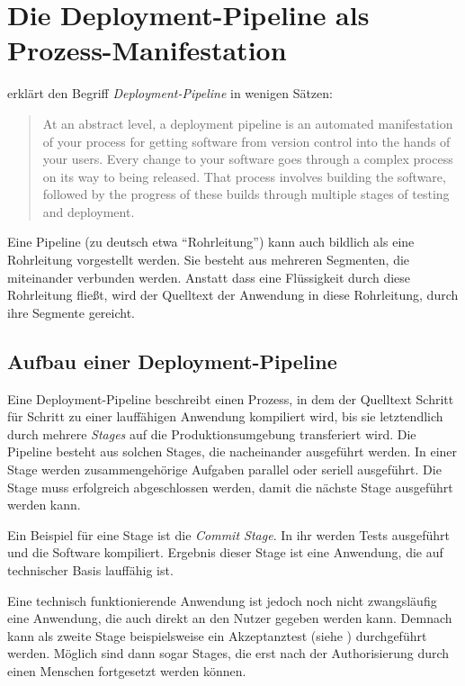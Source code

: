 \section{Die Deployment-Pipeline als Prozess-Manifestation}
\label{sec:deployment-pipeline}

\citet[106]{Humble2010} erklärt den Begriff \emph{Deployment-Pipeline} in wenigen Sätzen:

\begin{quote}
 At an abstract level, a deployment pipeline is an automated manifestation of your process for getting software from version control into the hands of your users. Every change to your software goes through a complex process on its way to being released. That process involves building the software, followed by the progress of these builds through multiple stages of testing and deployment.
\end{quote}

Eine Pipeline (zu deutsch etwa ``Rohrleitung'') kann auch bildlich als eine Rohrleitung vorgestellt werden. Sie besteht aus mehreren Segmenten, die miteinander verbunden werden. Anstatt dass eine Flüssigkeit durch diese Rohrleitung fließt, wird der Quelltext der Anwendung in diese Rohrleitung, durch ihre Segmente gereicht.

\subsection{Aufbau einer Deployment-Pipeline}

Eine Deployment-Pipeline beschreibt einen Prozess, in dem der Quelltext Schritt für Schritt zu einer lauffähigen Anwendung kompiliert wird, bis sie letztendlich durch mehrere \emph{Stages} auf die Produktionsumgebung transferiert wird. Die Pipeline besteht aus solchen Stages, die nacheinander ausgeführt werden. In einer Stage werden zusammengehörige Aufgaben parallel oder seriell ausgeführt. Die Stage muss erfolgreich abgeschlossen werden, damit die nächste Stage ausgeführt werden kann.

Ein Beispiel für eine Stage ist die \emph{Commit Stage}. In ihr werden Tests ausgeführt und die Software kompiliert. Ergebnis dieser Stage ist eine Anwendung, die auf technischer Basis lauffähig ist. \citep[110]{Humble2010}

Eine technisch funktionierende Anwendung ist jedoch noch nicht zwangsläufig eine Anwendung, die auch direkt an den Nutzer gegeben werden kann. Demnach kann als zweite Stage beispielsweise ein Akzeptanztest (siehe ) durchgeführt werden. Möglich sind dann sogar Stages, die erst nach der Authorisierung durch einen Menschen fortgesetzt werden können. \cite{FowlerDP}

